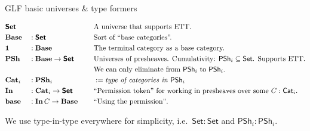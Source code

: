 \documentclass[dvipsnames,aspectratio=169]{beamer}
\newcommand{\mbf}[1]{\mathbf{#1}}
\newcommand{\bs}[1]{\boldsymbol{#1}}
\newcommand{\Set}{\mathsf{Set}}
\newcommand{\PSh}{\mathsf{PSh}}
\newcommand{\Cat}{\mathsf{Cat}}
\newcommand{\bBase}{\mathbf{Base}}
\newcommand{\bIn}{\mathbf{In}}
\newcommand{\bPSh}{\mathbf{PSh}}
\newcommand{\bCat}{\mathbf{Cat}}
\newcommand{\bbase}{\mathbf{base}}
\newcommand{\bSet}{\bs{\Set}}
\begin{document}
\begin{frame}{GLF basic universes \& type formers}

\begin{block}{}
\vspace{-1em}
\begin{alignat*}{3}
  & \bSet   &&           \hspace{8em}&& \text{A universe that supports ETT.}\\
  & \bBase  && : \bSet                 && \text{Sort of ``base categories''.} \\
  & \mbf{1} && : \bBase                && \text{The terminal category as a base category.} \\
  & \bPSh   && : \bBase \to \bSet      && \text{Universes of presheaves. Cumulativity: $\PSh_i \subseteq \Set$. Supports ETT.}\\
  &        &&                          && \text{We can only eliminate from $\PSh_i$ to $\PSh_i$.} \\
  & \bCat_i && : \bPSh_i               && := \text{\emph{type of categories in $\PSh_i$}} \\
  & \bIn    &&: \bCat_i \to \bSet      && \text{``Permission token'' for working in presheaves over some $C : \Cat_i$.} \\
  & \bbase  &&: \bIn\,C \to \bBase     && \text{``Using the permission''}.
\end{alignat*}
\end{block}
\vspace{1em}

{\small We use type-in-type everywhere for simplicity, i.e.\ $\Set : \Set$ and $\PSh_i : \PSh_i$.}

\end{frame}
\end{document}
